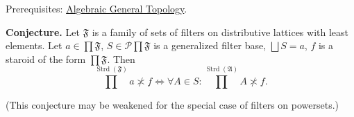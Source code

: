 \documentclass[12pt]{article}
\begin{document}
Prerequisites: \href{http://www.mathematics21.org/algebraic-general-topology.html}{Algebraic General Topology}.

{\bf Conjecture.} Let $\mathfrak{F}$ is a family of sets of filters on distributive lattices with least elements. Let $a\in\prod\mathfrak{F}$, $S\in\mathscr{P}\prod\mathfrak{F}$ is a generalized filter base, $\bigsqcup S=a$, $f$ is a staroid of the form $\prod\mathfrak{F}$. Then
\[ \prod^{\operatorname{Strd}(\mathfrak{F})}a \not\asymp f \Leftrightarrow
\forall A\in S: \prod^{\operatorname{Strd}(\mathfrak{A})}A \not\asymp f. \]

(This conjecture may be weakened for the special case of filters on powersets.)
\end{document}
